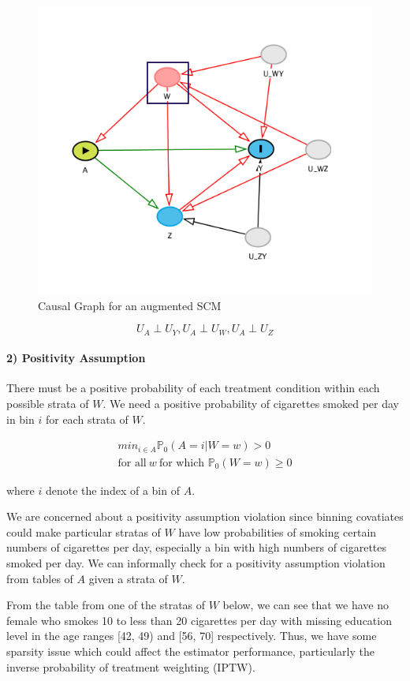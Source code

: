 \documentclass[]{article}
\let\oldparagraph\paragraph
\renewcommand{\paragraph}[1]{\oldparagraph{#1}\mbox{}}
\begin{document}
\begin{figure}[H]

{\centering \includegraphics[width=0.65\linewidth]{./dags/augmented_dag} 

}

\caption{Causal Graph for an augmented SCM}\label{fig:fig2}
\end{figure}

\[U_A\perp U_Y,U_A\perp U_W,U_A\perp U_Z\]

\hypertarget{positivity-assumption}{%
\paragraph{2) Positivity Assumption}\label{positivity-assumption}}

There must be a positive probability of each treatment condition within
each possible strata of \(W\). We need a positive probability of
cigarettes smoked per day in bin \(i\) for each strata of \(W\).

\[
\begin{aligned}
min_{i\in A}\mathbb{P}_0(A=i|W=w)>0\\
\text{for all}\ w \ \text{for which } 
\mathbb{P}_0(W = w) \geq 0
\end{aligned}
\]

where \(i\) denote the index of a bin of \(A\).

We are concerned about a positivity assumption violation since binning
covatiates could make particular stratas of \(W\) have low probabilities
of smoking certain numbers of cigarettes per day, especially a bin with
high numbers of cigarettes smoked per day. We can informally check for a
positivity assumption violation from tables of \(A\) given a strata of
\(W\).

From the table from one of the stratas of \(W\) below, we can see that
we have no female who smokes 10 to less than 20 cigarettes per day with
missing education level in the age ranges {[}42, 49) and {[}56, 70{]}
respectively. Thus, we have some sparsity issue which could affect the
estimator performance, particularly the inverse probability of treatment
weighting (IPTW).
\end{document}
